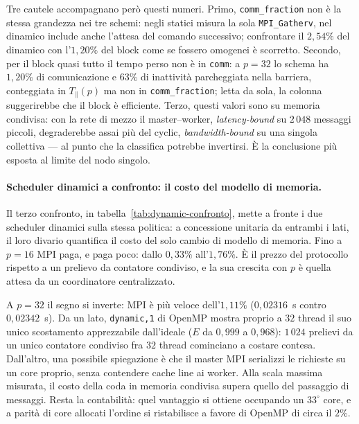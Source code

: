 Tre cautele accompagnano però questi numeri. Primo, \texttt{comm\_fraction} non è
la stessa grandezza nei tre schemi: negli statici misura la sola
\texttt{MPI\_Gatherv}, nel dinamico include anche l'attesa del comando successivo; confrontare il
$2{,}54\%$ del dinamico con l'$1{,}20\%$ del block come se fossero omogenei è
scorretto. Secondo, per il block quasi tutto il tempo perso non è in
\texttt{comm}: a $p=32$ lo schema ha $1{,}20\%$ di comunicazione e $63\%$ di
inattività parcheggiata nella barriera, conteggiata in $T_\parallel(p)$ ma non
in \texttt{comm\_fraction}; letta da sola, la colonna suggerirebbe che il block
è efficiente. Terzo, questi valori sono su memoria condivisa: con la rete di
mezzo il master--worker, \emph{latency-bound} su $2\,048$ messaggi piccoli,
degraderebbe assai più del cyclic, \emph{bandwidth-bound} su una singola
collettiva --- al punto che la classifica potrebbe invertirsi. È la conclusione
più esposta al limite del nodo singolo.

\paragraph{Scheduler dinamici a confronto: il costo del modello di memoria.}
Il terzo confronto, in tabella~\ref{tab:dynamic-confronto}, mette a fronte i due
scheduler dinamici sulla stessa politica: a concessione unitaria da entrambi i
lati, il loro divario quantifica il costo del solo cambio di modello di memoria.
Fino a $p=16$ MPI paga, e paga poco: dallo $0{,}33\%$ all'$1{,}76\%$. È il
prezzo del protocollo rispetto a un prelievo da contatore condiviso, e la sua
crescita con $p$ è quella attesa da un coordinatore centralizzato.

A $p=32$ il segno si inverte: MPI è più veloce dell'$1{,}11\%$ ($0{,}02316$~s
contro $0{,}02342$~s). Da un lato, \texttt{dynamic,1} di OpenMP mostra proprio a
$32$ thread il suo unico scostamento apprezzabile dall'ideale ($E$ da $0{,}999$
a $0{,}968$): $1\,024$ prelievi da un unico contatore condiviso fra $32$ thread
cominciano a costare contesa. Dall'altro, una possibile spiegazione è che il master
MPI serializzi le richieste su un core proprio, senza contendere cache line ai
worker. Alla scala
massima misurata, il costo della coda in memoria condivisa supera quello del
passaggio di messaggi. Resta la contabilità: quel vantaggio si ottiene occupando
un $33^{\circ}$ core, e a parità di core allocati l'ordine si ristabilisce a
favore di OpenMP di circa il $2\%$.

